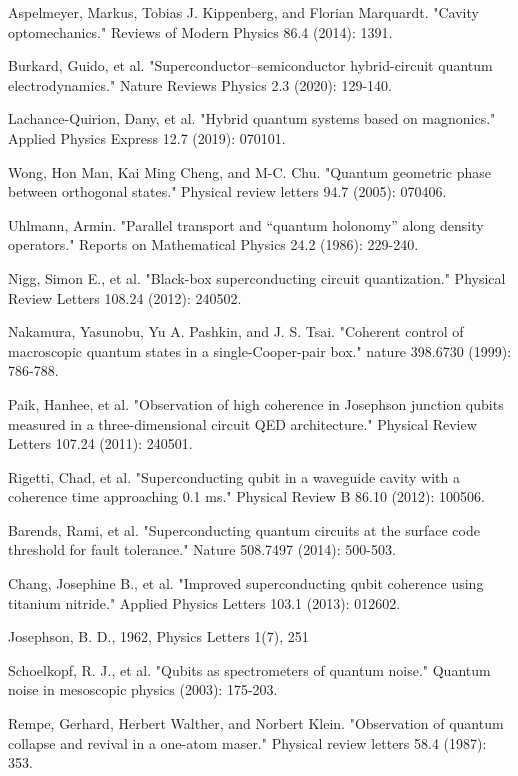 \begin{thebibliography}{9}
Aspelmeyer, Markus, Tobias J. Kippenberg, and Florian Marquardt. "Cavity optomechanics." Reviews of Modern Physics 86.4 (2014): 1391.

Burkard, Guido, et al. "Superconductor–semiconductor hybrid-circuit quantum electrodynamics." Nature Reviews Physics 2.3 (2020): 129-140.

Lachance-Quirion, Dany, et al. "Hybrid quantum systems based on magnonics." Applied Physics Express 12.7 (2019): 070101.

Wong, Hon Man, Kai Ming Cheng, and M-C. Chu. "Quantum geometric phase between orthogonal states." Physical review letters 94.7 (2005): 070406.

Uhlmann, Armin. "Parallel transport and “quantum holonomy” along density operators." Reports on Mathematical Physics 24.2 (1986): 229-240.



Nigg, Simon E., et al. "Black-box superconducting circuit quantization." Physical Review Letters 108.24 (2012): 240502.

Nakamura, Yasunobu, Yu A. Pashkin, and J. S. Tsai. "Coherent control of macroscopic quantum states in a single-Cooper-pair box." nature 398.6730 (1999): 786-788.

Paik, Hanhee, et al. "Observation of high coherence in Josephson junction qubits measured in a three-dimensional circuit QED architecture." Physical Review Letters 107.24 (2011): 240501.

Rigetti, Chad, et al. "Superconducting qubit in a waveguide cavity with a coherence time approaching 0.1 ms." Physical Review B 86.10 (2012): 100506.

Barends, Rami, et al. "Superconducting quantum circuits at the surface code threshold for fault tolerance." Nature 508.7497 (2014): 500-503.

Chang, Josephine B., et al. "Improved superconducting qubit coherence using titanium nitride." Applied Physics Letters 103.1 (2013): 012602.

Josephson, B. D., 1962, Physics Letters 1(7), 251


Schoelkopf, R. J., et al. "Qubits as spectrometers of quantum noise." Quantum noise in mesoscopic physics (2003): 175-203.

Rempe, Gerhard, Herbert Walther, and Norbert Klein. "Observation of quantum collapse and revival in a one-atom maser." Physical review letters 58.4 (1987): 353.


\end{thebibliography}

